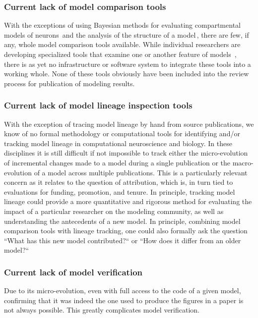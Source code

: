 \documentclass[12pt]{article}
\begin{document}
\subsubsection*{Current lack of model comparison tools}

With the exceptions of using Bayesian methods for evaluating compartmental models of neurons\,\cite{Baldi:1998qa} and the analysis of the structure of a model\,\cite{Hines:2007mi}, there are few, if any, whole model comparison tools available.  While individual researchers are developing specialized tools that examine one or another feature of models\,\cite{Cannon:2006pi, Druckmann:2007ff} , there is as yet no infrastructure or software system to integrate these tools into a working whole.  None of these tools obviously have been included into the review process for publication of modeling results.

\subsubsection*{Current lack of model lineage inspection tools}

With the exception of tracing model lineage by hand from source publications, we know of no formal methodology or computational tools for identifying and/or tracking model lineage in computational neuroscience and biology. In these disciplines it is still difficult if not impossible to track either the micro-evolution of incremental changes made to a model during a single publication or the macro-evolution of a model across multiple publications.  This is a particularly relevant concern as it relates to the question of attribution, which is, in turn tied to evaluations for funding, promotion, and tenure.  In principle, tracking model lineage could provide a more quantitative and rigorous method for evaluating the impact of a particular researcher on the modeling community, as well as understanding the antecedents of a new model. In principle, combining model comparison tools with lineage tracking, one could also formally ask the question ``What has this new model contributed?`` or ``How does it differ from an older model?``

\subsubsection*{Current lack of model verification}

Due to its micro-evolution, even with full access to the code of a given model, confirming that it was indeed the one used to produce the figures in a paper is not always possible. This greatly complicates model verification.
\end{document}
